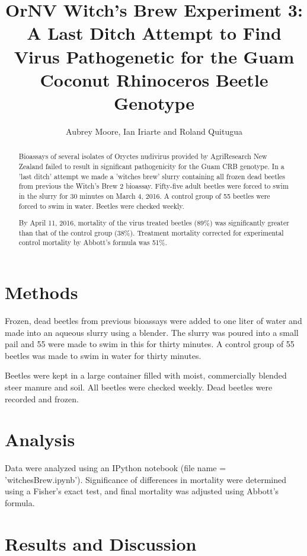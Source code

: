 \documentclass[letterpaper,11pt]{scrartcl}
\title{OrNV Witch's Brew Experiment 3: A Last Ditch Attempt to Find Virus Pathogenetic for the Guam Coconut
Rhinoceros Beetle Genotype}
\author{Aubrey Moore, Ian Iriarte and Roland Quitugua}
\begin{document}
\maketitle

\begin{abstract}
Bioassays of several isolates of Oryctes nudivirus provided by AgriResearch New Zealand failed to result in 
significant pathogenicity for the Guam CRB genotype. In a 'last ditch' attempt we made a 'witches brew' slurry 
containing all frozen dead beetles from previous the Witch's Brew 2 bioassay. Fifty-five 
adult beetles were forced to swim in the slurry for 30 minutes on March 4, 2016. A control group of
55 beetles were forced to swim in water. Beetles were checked weekly.

By April 11, 2016, mortality of the virus treated beetles (89\%) was significantly greater than that of the
control group (38\%). Treatment mortality corrected for experimental control mortality by Abbott's 
formula was 51\%.
\end{abstract}

\section*{Methods}

Frozen, dead beetles from previous bioassays were added to one liter of water and made into an aqueous slurry
using a blender. The slurry was poured into a small pail and
55 were made to swim in this for thirty minutes. A control group of 55 beetles was made to swim in water for 
thirty minutes.

Beetles were kept in a large container filled with moist, commercially blended steer manure and soil. 
All beetles were checked weekly. Dead beetles were recorded and frozen.

\section*{Analysis}

Data were analyzed using an IPython notebook (file name = 'witchesBrew.ipynb'). Significance of differences in mortality
were determined using a Fisher's exact test, and final mortality was adjusted using Abbott's formula.

\section*{Results and Discussion}
\end{document}
